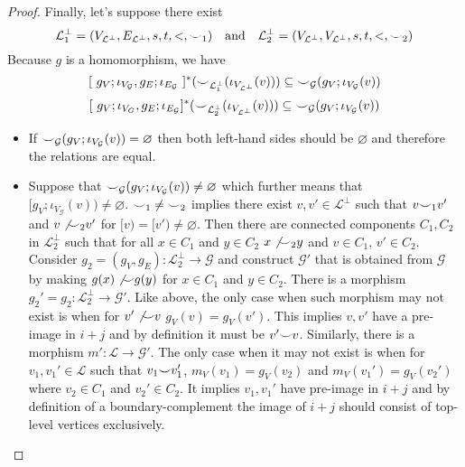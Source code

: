 \begin{proof}
    Finally, let's suppose there exist
    \[
        \mathcal{L}^{\bot}_{1} = (V_{\mathcal{L}^{\bot}}, E_{\mathcal{L}^{\bot}}, s,t, <, {\smile}_{1})
    \quad
    \text{and}
    \quad
        \mathcal{L}^{\bot}_{2} = (V_{\mathcal{L}^{\bot}},V_{\mathcal{L}^{\bot}},s,t,<, {\smile}_{2})
    \]
    Because $g$ is a homomorphism, we have
    \[
        [~g_{V};\iota_{V_{\mathcal{G}}}, g_{E};\iota_{E_{\mathcal{G}}}~]^{*}({\smile}_{\mathcal{L}^{\bot}_{1}}(\iota_{V_{\mathcal{L}^{\bot}}}(v))) \subseteq {\smile}_{\mathcal{G}}(g_{V};\iota_{V_{\mathcal{G}}}(v))
    \]
    \[
        [~g_{V};\iota_{V_{G}}, g_{E};\iota_{E_{\mathcal{G}}}]^{*}({\smile}_{\mathcal{L}^{\bot}_{2}}(\iota_{V_{\mathcal{L}^{\bot}}}(v))) \subseteq {\smile}_{\mathcal{G}}(g_{V};\iota_{V_{\mathcal{G}}}(v))
    \]
    \begin{itemize}
        \item If ${\smile}_{\mathcal{G}}(g_{V};\iota_{V_{\mathcal{G}}}(v)) = \varnothing$ then both left-hand sides should be $\varnothing$ and therefore the relations are equal.
        \item Suppose that ${\smile}_{\mathcal{G}}(g_{V};\iota_{V_{\mathcal{G}}}(v)) \not = \varnothing$ which further means that $[g_{V};\iota_{V_{\mathcal{G}}}(v)) \not = \varnothing$.
              ${\smile}_{1} \not = {\smile}_{2}$ implies there exist $v, v' \in \mathcal{L}^{\bot}$ such that $v {\smile}_{1} v'$ and $v \not {\smile}_{2} v'$ for $[v) = [v') \not = \varnothing$.
              Then there are connected components $C_1, C_2$ in $\mathcal{L}_{2}^{\bot}$ such that for all $x \in C_1$ and $y \in C_2$ $x \not {\smile}_{2} y$ and $v \in C_1$, $v' \in C_2$.
              Consider $g_2 = (g_{V},g_{E}) : \mathcal{L}_2^{\bot} \to \mathcal{G}$ and construct $\mathcal{G'}$ that is obtained from $\mathcal{G}$ by making $g(x) \not {\smile} g(y)$ for $x \in C_1$ and $y \in C_2$.
              There is a morphism $g_2' = g_2 : \mathcal{L}_2^{\bot} \to \mathcal{G}'$. Like above, the only case when such morphism may not exist is when for $v' \not {\smile} v$ $g_{V}(v) = g_{V}(v')$.
              This implies $v, v'$ have a pre-image in $i + j$ and by definition it must be $v' {\smile} v$.
              Similarly, there is a morphism $m' : \mathcal{L} \to \mathcal{G}'$. The only case when it may not exist is when for $v_1, v_1' \in \mathcal{L}$ such that $v_1 {\smile} v_1'$, $m_{V}(v_1) = g_{V}(v_2)$ and $m_{V}(v_1') = g_{V}(v_2')$ where $v_2 \in C_1$ and $v_2' \in C_2$.
              It implies $v_1, v_1'$ have pre-image in $i + j$ and by definition of a boundary-complement the image of $i + j$ should consist of top-level vertices exclusively.

\end{itemize}
\end{proof}

